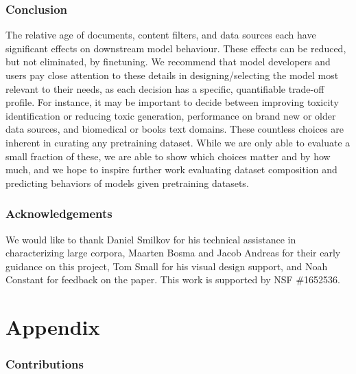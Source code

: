 \documentclass{article}
\begin{document}
\vspace{-3mm}
\section{Conclusion}
The relative age of documents, content filters, and data sources each have significant effects on downstream model behaviour.
These effects can be reduced, but not eliminated, by finetuning.
We recommend that model developers and users pay close attention to these details in designing/selecting the model most relevant to their needs, as each decision has a specific, quantifiable trade-off profile. 
For instance, it may be important to decide between improving toxicity identification or reducing toxic generation, performance on brand new or older data sources, and biomedical or books text domains.
These countless choices are inherent in curating any pretraining dataset.
While we are only able to evaluate a small fraction of these, we are able to show which choices matter and by how much, and we hope to inspire further work evaluating dataset composition and predicting behaviors of models given pretraining datasets.


\section*{Acknowledgements}
We would like to thank Daniel Smilkov for his technical assistance in characterizing large corpora, Maarten Bosma and Jacob Andreas for their early guidance on this project, Tom Small for his visual design support, and Noah Constant for feedback on the paper.
This work is supported by NSF \#1652536.




\clearpage
\appendix
{}
{} 
\part{Appendix} 
\parttoc

\vspace{-3mm}
\section{Contributions}
\end{document}
